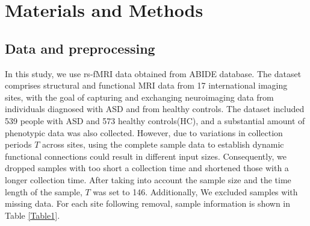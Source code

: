 \documentclass[journal,twoside,web]{ieeecolor}
\begin{document}
\newpage
\section{Materials and Methods}
\subsection{Data and preprocessing}
In this study, we use rs-fMRI data obtained from ABIDE database\cite{craddock2013neuro}. The dataset comprises structural and functional MRI data from 17 international imaging sites, with the goal of capturing and exchanging neuroimaging data from individuals diagnosed with ASD and from healthy controls. The dataset included 539 people with ASD and 573 healthy controls(HC), and a substantial amount of phenotypic data was also collected. However, due to variations in collection periods $T$ across sites, using the complete sample data to establish dynamic functional connections could result in different input sizes. Consequently, we dropped samples with too short a collection time and shortened those with a longer collection time. After taking into account the sample size and the time length of the sample, $T$ was set to 146. Additionally, We excluded samples with missing data. For each site following removal, sample information is shown in Table \ref{Table1}.
\end{document}
